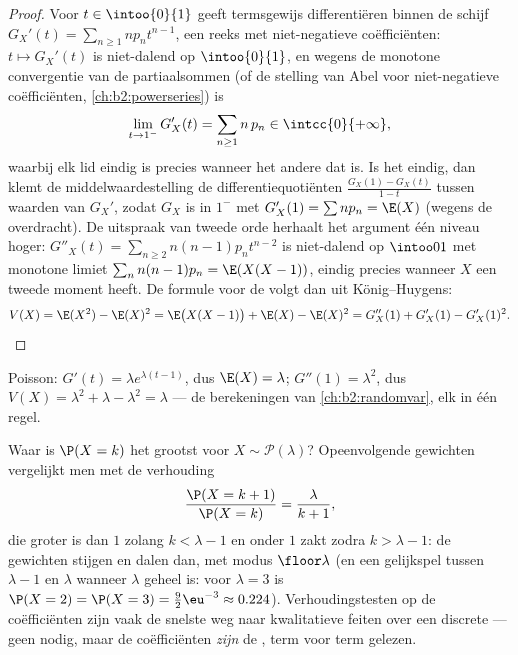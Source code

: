 \begin{proof}
Voor $t \in \intoo{0}{1}$ geeft termsgewijs differentiëren binnen
de schijf $G_X'(t) = \sum_{n\geq1} np_n t^{n-1}$, een reeks met
niet-negatieve coëfficiënten: $t \mapsto G_X'(t)$ is niet-dalend
op $\intoo{0}{1}$, en wegens de monotone convergentie van de
partiaalsommen (of de stelling van Abel voor niet-negatieve
coëfficiënten, \cref{ch:b2:powerseries}) is
\[
\lim_{t \to 1^-} G_X'(t)
= \sum_{n\geq1} n\,p_n \in \intcc{0}{+\infty} ,
\]
waarbij elk lid eindig is precies wanneer het andere dat is. Is het
eindig, dan klemt de middelwaardestelling de differentiequotiënten
$\frac{G_X(1) - G_X(t)}{1 - t}$ tussen waarden van $G_X'$, zodat
$G_X$  is in $1^-$ met $G_X'(1) = \sum np_n =
\E(X)$ (wegens de overdracht). De uitspraak van tweede orde
herhaalt het argument één niveau hoger: $G''_X(t) =
\sum_{n\geq2}n(n-1)p_nt^{n-2}$ is niet-dalend op $\intoo01$ met
monotone limiet $\sum_nn(n-1)p_n = \E(X(X-1))$, eindig precies
wanneer $X$ een tweede moment heeft. De formule voor de 
volgt dan uit König--Huygens:
\[
V(X) = \E(X^2) - \E(X)^2 = \E\bigl(X(X-1)\bigr) + \E(X) -
\E(X)^2 = G''_X(1) + G'_X(1) - G'_X(1)^2 .
\]
\end{proof}

\begin{example}
Poisson: $G'(t) = \lambda e^{\lambda(t-1)}$, dus $\E(X) = \lambda$;
$G''(1) = \lambda^2$, dus $V(X) = \lambda^2 + \lambda - \lambda^2 =
\lambda$ --- de berekeningen van \cref{ch:b2:randomvar}, elk in één
regel.
\end{example}

\begin{example}
\label{ex:b2:genfun:poissonmode}
Waar is $\P(X = k)$ het grootst voor $X \sim \mathcal
P(\lambda)$? Opeenvolgende gewichten vergelijkt men met de
verhouding
\[
\frac{\P(X = k+1)}{\P(X = k)} = \frac{\lambda}{k + 1} ,
\]
die groter is dan $1$ zolang $k < \lambda - 1$ en onder $1$ zakt
zodra $k > \lambda - 1$: de gewichten stijgen en dalen dan, met
modus $\floor\lambda$ (en een gelijkspel tussen $\lambda - 1$ en
$\lambda$ wanneer $\lambda$ geheel is: voor $\lambda = 3$ is $\P(X
= 2) = \P(X = 3) = \frac92\eu^{-3} \approx 0.224$).
Verhoudingstesten op de coëfficiënten zijn vaak de snelste weg naar
kwalitatieve feiten over een discrete  --- geen
 nodig, maar de coëfficiënten \emph{zijn} de
, term voor term gelezen.
\end{example}

